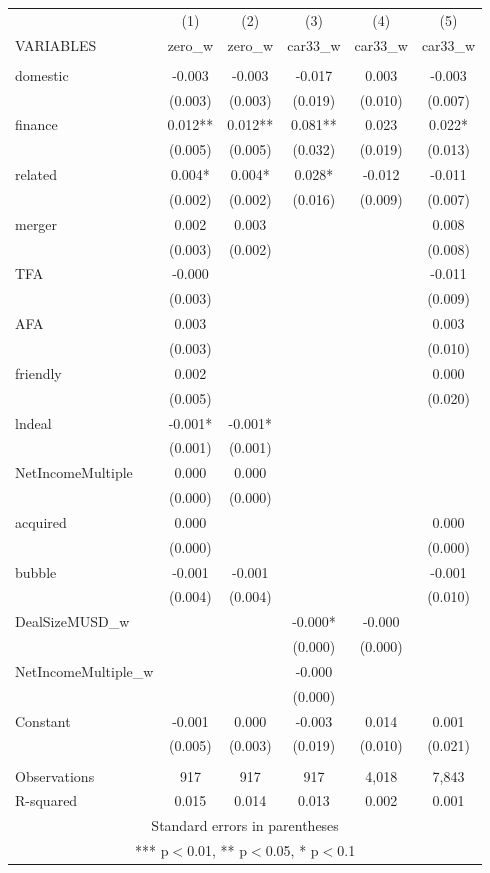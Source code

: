 
\setlength{\pdfpagewidth}{8.5in} \setlength{\pdfpageheight}{11in}

\begin{tabular}{lccccc} \hline
 & (1) & (2) & (3) & (4) & (5) \\
VARIABLES & zero\_w & zero\_w & car33\_w & car33\_w & car33\_w \\ \hline
 &  &  &  &  &  \\
domestic & -0.003 & -0.003 & -0.017 & 0.003 & -0.003 \\
 & (0.003) & (0.003) & (0.019) & (0.010) & (0.007) \\
finance & 0.012** & 0.012** & 0.081** & 0.023 & 0.022* \\
 & (0.005) & (0.005) & (0.032) & (0.019) & (0.013) \\
related & 0.004* & 0.004* & 0.028* & -0.012 & -0.011 \\
 & (0.002) & (0.002) & (0.016) & (0.009) & (0.007) \\
merger & 0.002 & 0.003 &  &  & 0.008 \\
 & (0.003) & (0.002) &  &  & (0.008) \\
TFA & -0.000 &  &  &  & -0.011 \\
 & (0.003) &  &  &  & (0.009) \\
AFA & 0.003 &  &  &  & 0.003 \\
 & (0.003) &  &  &  & (0.010) \\
friendly & 0.002 &  &  &  & 0.000 \\
 & (0.005) &  &  &  & (0.020) \\
lndeal & -0.001* & -0.001* &  &  &  \\
 & (0.001) & (0.001) &  &  &  \\
NetIncomeMultiple & 0.000 & 0.000 &  &  &  \\
 & (0.000) & (0.000) &  &  &  \\
acquired & 0.000 &  &  &  & 0.000 \\
 & (0.000) &  &  &  & (0.000) \\
bubble & -0.001 & -0.001 &  &  & -0.001 \\
 & (0.004) & (0.004) &  &  & (0.010) \\
DealSizeMUSD\_w &  &  & -0.000* & -0.000 &  \\
 &  &  & (0.000) & (0.000) &  \\
NetIncomeMultiple\_w &  &  & -0.000 &  &  \\
 &  &  & (0.000) &  &  \\
Constant & -0.001 & 0.000 & -0.003 & 0.014 & 0.001 \\
 & (0.005) & (0.003) & (0.019) & (0.010) & (0.021) \\
 &  &  &  &  &  \\
Observations & 917 & 917 & 917 & 4,018 & 7,843 \\
 R-squared & 0.015 & 0.014 & 0.013 & 0.002 & 0.001 \\ \hline
\multicolumn{6}{c}{ Standard errors in parentheses} \\
\multicolumn{6}{c}{ *** p$<$0.01, ** p$<$0.05, * p$<$0.1} \\
\end{tabular}
